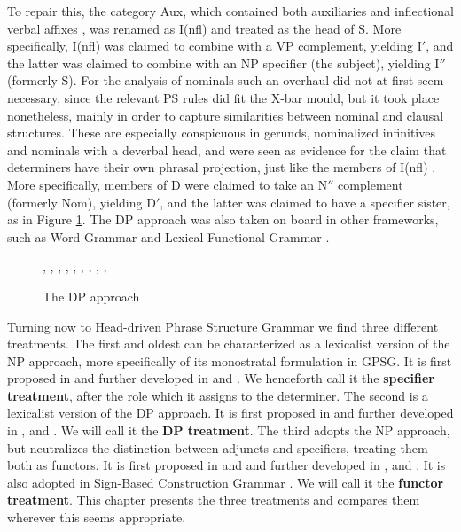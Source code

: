 \documentclass[output=paper]{langsci/langscibook}
\begin{document}
\noindent
To repair this, the category Aux, which contained both auxiliaries and 
inflectional verbal affixes \citep{Chomsky57}, was renamed as I(nfl) and treated as the head of S. 
More specifically, I(nfl) was claimed to combine with a VP complement, yielding I$'$, 
and the latter was claimed to combine with an NP specifier (the subject), yielding I$''$
(formerly S).
For the analysis of nominals such an overhaul did not at first seem necessary, 
since the relevant PS rules did fit the X-bar mould, but it took place nonetheless, 
mainly in order to capture similarities between nominal and clausal structures. 
These are especially conspicuous in gerunds, nominalized infinitives and nominals 
with a deverbal head, and were seen as evidence for the claim that determiners have their 
own phrasal projection, just like the members of I(nfl) \citep{Abney87}. 
More specifically, members of D were claimed to take an N$''$ complement (formerly Nom), 
yielding D$'$, and the latter was claimed to have a specifier sister, as in Figure \ref{abn}.
The DP approach was also taken on board in other frameworks, 
such as Word Grammar \citep{Hudson90} and Lexical Functional Grammar \citep[99]{Bresnan00}. 

\begin{figure}
\begin{center}
\footnotesize
\tree
{,
  {,
    {,
      {}},
    {,
      {,
        {,
          {}},
        {, 
          {}}}}}}
\caption{\label{abn} The DP approach } 
\normalsize
\end{center}
\end{figure}
     
Turning now to Head-driven Phrase Structure Grammar we find three different treatments.  
The first and oldest can be characterized as a lexicalist version of the NP approach, more 
specifically of its monostratal formulation in GPSG.  
It is first proposed in \citet{ps} and further developed in \citet{ps2} and 
\citet{GS00}. We henceforth call it the {\bf specifier treatment}, 
after the role which it assigns to the determiner. 
The second is a lexicalist version of the DP approach.  
It is first proposed in \citet{Netter94} and further developed in \citet{Netter96a},
and \citet{NerbonneMullen00}. We will call it the {\bf DP treatment}. 
The third adopts the NP approach, but neutralizes the distinction between adjuncts and specifiers, 
treating them both as functors. It is first proposed in \citet{VanEynde98a} and 
\citet{Allegranza98} and further developed in \citet{VanEynde03}, \citet{VanEynde06} 
and \citet{Allegranza06}. It is also adopted in Sign-Based Construction Grammar \citep{Sag2012}. 
We will call it the {\bf functor treatment}. This chapter presents the three treatments and 
compares them wherever this seems appropriate.  
\end{document}
